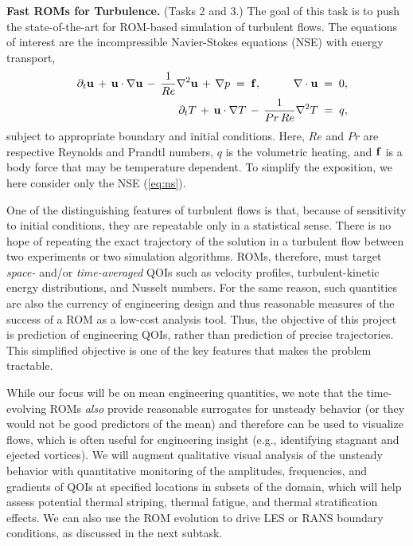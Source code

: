 \vspace{.08in}
\noindent \textbf{Fast ROMs for Turbulence.} (Tasks 2 and 3.)
The goal of this task is to push the state-of-the-art for ROM-based 
simulation of turbulent flows.
The equations of interest are the incompressible Navier-Stokes equations
(NSE) with energy transport, \\[-2.6ex]
\begin{eqnarray} \label{eq:ns}
&&
\partial_t \mathbf{u} \,+\, \mathbf{u} \cdot \nabla \mathbf{u} \,-\, \frac{1}{Re} \nabla^2 \mathbf{u}
\,+\, \nabla p \;=\; \mathbf{f}, \hspace*{.4in} \nabla \cdot \mathbf{u} \;=\; 0, 
\\ \label{eq:therm} 
&&
\partial_t T   \,+\, \mathbf{u} \cdot \nabla T   \,-\, \frac{1}{Pr\,Re} \nabla^2 T
\;=\; q, 
\end{eqnarray}
subject to appropriate boundary and initial conditions. Here, $Re$ and $Pr$ are
respective Reynolds and Prandtl numbers, $q$ is the volumetric heating, and
$\mathbf{f}$ is a body force that may be temperature dependent.
   To simplify the exposition, we here consider only the NSE (\ref{eq:ns}).

One of the distinguishing features of turbulent flows is that, because of
sensitivity to initial conditions, they are repeatable only in a statistical
sense.  There is no hope of repeating the exact trajectory of the solution in a
turbulent flow between two experiments or two simulation algorithms.  ROMs,
therefore, must target {\em space-} and/or {\em time-averaged} QOIs such as
velocity profiles,  turbulent-kinetic energy distributions, and Nusselt
numbers.  For the same reason, such quantities are also the currency of
engineering design and thus reasonable measures of the success of a ROM as a
low-cost analysis tool.  Thus, the objective of this project is prediction of
engineering QOIs, rather than prediction of precise trajectories.  This
simplified objective is one of the key features that makes the problem
tractable.

    While our focus will be on mean engineering quantities, we note that the
time-evolving ROMs {\em also} provide reasonable surrogates for unsteady
behavior (or they would not be good predictors of the mean) and therefore can
be used to visualize flows, which is often useful for engineering insight
(e.g., identifying stagnant and ejected vortices).  We will augment
qualitative visual analysis of the unsteady behavior with quantitative
monitoring of the amplitudes, frequencies, and gradients of QOIs at specified
locations in subsets of the domain, which will help assess potential
thermal striping, thermal fatigue, and thermal stratification effects.
We can also use the ROM evolution to drive LES or RANS boundary conditions,
as discussed in the next subtask.

